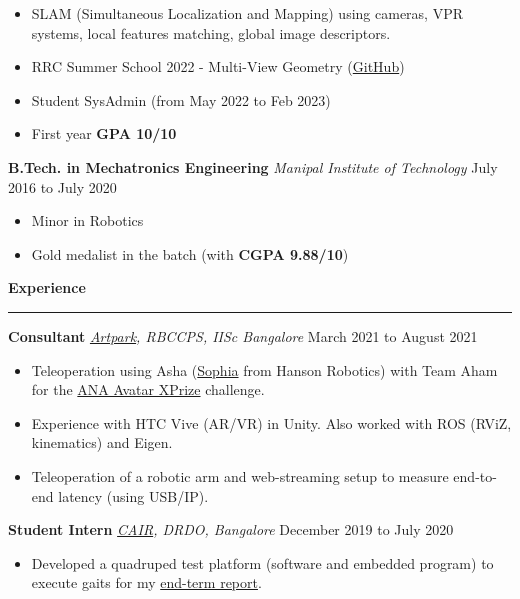 \documentclass{article}
\newcommand{\newsec}[1]{
    {\bf \large #1}
    \vspace{2mm}
    \hrule
    \vspace{2mm}
}
\newcommand{\expheader}[3]{
    {\bf #1} \hfill {\it #2} \hfill #3
}
\begin{document}
    \begin{itemize}
        \setlength{\itemsep}{0mm}
        \item SLAM (Simultaneous Localization and Mapping) using 
            cameras, VPR systems, local features matching, global
            image descriptors.
        \item RRC Summer School 2022 - Multi-View Geometry (\href{https://github.com/TheProjectsGuy/RRC22-Summer-School-MVG4}{GitHub})
        \item Student SysAdmin (from May 2022 to Feb 2023)
        \item First year {\bf GPA 10/10}
    \end{itemize}
    \expheader{B.Tech. in Mechatronics Engineering}{Manipal Institute 
        of Technology}{July 2016 to July 2020}
    \begin{itemize}
        \setlength{\itemsep}{0mm}
        \item Minor in Robotics
        \item Gold medalist in the batch (with {\bf CGPA 9.88/10})
    \end{itemize}
    \newsec{Experience}
    \expheader{Consultant}{
        \href{https://artpark.in/}{Artpark}, RBCCPS, IISc Bangalore}{
        March 2021 to August 2021}
    \begin{itemize}
        \setlength{\itemsep}{0mm}
        \item Teleoperation using Asha (\href{
            https://www.hansonrobotics.com/sophia/}{Sophia} from 
            Hanson Robotics) with Team Aham for the \href{
            https://avatar.xprize.org/prizes/avatar}{ANA Avatar 
            XPrize} challenge.
        \item Experience with HTC Vive (AR/VR) in Unity. Also worked
            with ROS (RViZ, kinematics) and Eigen.
        \item Teleoperation of a robotic arm and web-streaming setup
            to measure end-to-end latency (using USB/IP).
    \end{itemize}
    \expheader{Student Intern}{
        \href{https://www.drdo.gov.in/drdo/labs-and-establishments/centre-artificial-intelligence-robotics-cair}{CAIR}, 
        DRDO, Bangalore}{December 2019 to July 2020}
    \begin{itemize}
        \setlength{\itemsep}{0mm}
        \item Developed a quadruped test platform (software and
            embedded program) to execute gaits for my
            \href{https://www.dropbox.com/scl/fi/ntwybuhk6n4kn3bfkkesc/BTech-Mechatronics-Endterm-Report.pdf?rlkey=buo9s7dxvl8ohvdv8dr28wf5v&dl=0}{end-term
            report}.
    \end{itemize}
\end{document}
